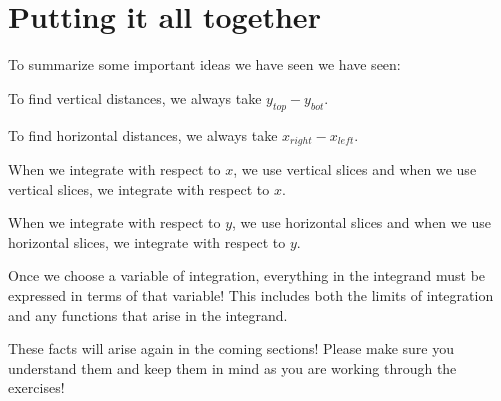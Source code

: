 \documentclass{ximera}
\begin{document}
\section{Putting it all together}
 To summarize some important ideas we have seen we have seen:


\begin{fact}
To find vertical distances, we always take $y_{top} - y_{bot}$.

To find horizontal distances, we always take $x_{right}-x_{left}$.
\end{fact}

\begin{fact}
When we integrate with respect to $x$, we use vertical slices and when we use vertical slices, we integrate with respect to $x$.

When we integrate with respect to $y$, we use horizontal slices and when we use horizontal slices, we integrate with respect to $y$.
\end{fact}

\begin{fact}
Once we choose a variable of integration, everything in the integrand must be expressed in terms of that variable!  This includes both the limits of integration and any functions that arise in the integrand.
\end{fact}

These facts will arise again in the coming sections!  Please make sure you understand them and keep them in mind as you are working through the exercises!
\end{document}
